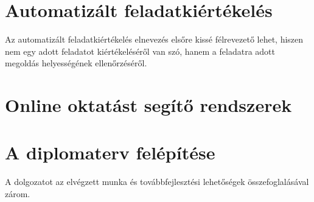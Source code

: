 \section{Automatizált feladatkiértékelés}
Az automatizált feladatkiértékelés elnevezés elsőre kissé félrevezető lehet, hiszen nem egy adott feladatot kiértékeléséről van szó, hanem a feladatra adott megoldás helyességének ellenőrzéséről.


\section{Online oktatást segítő rendszerek}


\section{A diplomaterv felépítése}
A dolgozatot az elvégzett munka és továbbfejlesztési lehetőségek összefoglalásával zárom.

